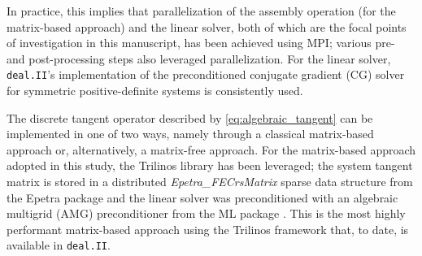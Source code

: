 \documentclass[AMA,STIX1COL]{WileyNJD-v2}
\begin{document}
In practice, this implies that parallelization of the assembly operation (for the matrix-based approach) and the linear solver, both of which are the focal points of investigation in this manuscript, has been achieved using MPI;
various pre- and post-processing steps also leveraged parallelization.
For the linear solver, \texttt{deal.II}'s implementation of the preconditioned conjugate gradient (CG) solver for symmetric positive-definite systems is consistently used.

The discrete tangent operator described by \eqref{eq:algebraic_tangent} can be implemented in one of two ways, namely through a classical matrix-based approach or, alternatively, a matrix-free approach.
For the matrix-based approach adopted in this study, the Trilinos \cite{Heroux2005} library has been leveraged;
the system tangent matrix is stored in a distributed \textit{Epetra\_FECrsMatrix} sparse data structure from the Epetra package \cite{Heroux2005b} and the linear solver was preconditioned with an algebraic multigrid (AMG) preconditioner from the ML package \cite{Gee2006a}.
This is the most highly performant matrix-based approach using the Trilinos framework that, to date, is available in \texttt{deal.II}.
\end{document}
